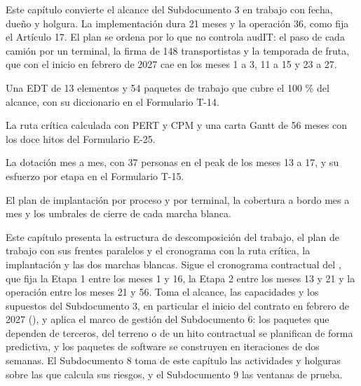 %

\begin{resumenApertura}
Este capítulo convierte el alcance del Subdocumento 3 en trabajo con fecha, dueño y holgura. La
implementación dura 21 meses y la operación 36, como fija el Artículo 17. El plan se ordena por lo que
no controla audIT: el paso de cada camión por un terminal, la firma de 148 transportistas y la
temporada de fruta, que con el inicio en febrero de 2027 cae en los meses 1 a 3, 11 a 15 y 23 a 27.
\begin{recibe}
  \item Una EDT de 13 elementos y 54 paquetes de trabajo que cubre el 100 \% del alcance, con su diccionario en el Formulario T-14.
  \item La ruta crítica calculada con PERT y CPM y una carta Gantt de 56 meses con los doce hitos del Formulario E-25.
  \item La dotación mes a mes, con 37 personas en el peak de los meses 13 a 17, y su esfuerzo por etapa en el Formulario T-15.
  \item El plan de implantación por proceso y por terminal, la cobertura a bordo mes a mes y los umbrales de cierre de cada marcha blanca.
\end{recibe}
\end{resumenApertura}

Este capítulo presenta la estructura de descomposición del trabajo, el plan de trabajo con sus
frentes paralelos y el cronograma con la ruta crítica, la implantación y las dos marchas blancas.
Sigue el cronograma contractual del , que fija la Etapa 1 entre los meses 1 y 16, la
Etapa 2 entre los meses 13 y 21 y la operación entre los meses 21 y 56. Toma el alcance, las
capacidades y los supuestos del Subdocumento 3, en particular el inicio del contrato en febrero de 2027
(), y aplica el marco de gestión del Subdocumento 6: los paquetes que
dependen de terceros, del terreno o de un hito contractual se planifican de forma predictiva, y los
paquetes de software se construyen en iteraciones de dos semanas. El Subdocumento 8 toma de este
capítulo las actividades y holguras sobre las que calcula sus riesgos, y el Subdocumento 9 las ventanas
de prueba.

